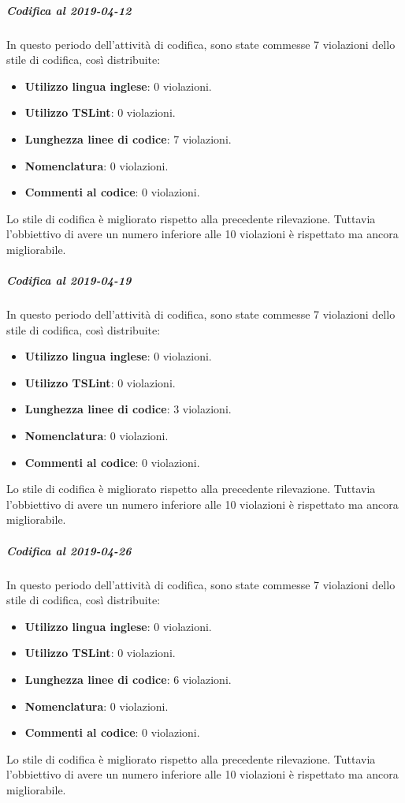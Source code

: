 \subparagraph{Codifica al 2019-04-12}
In questo periodo dell'attività di codifica, sono state commesse 7 violazioni dello stile di codifica, così distribuite:
 \begin{itemize}
 	\item \textbf{Utilizzo lingua inglese}: 0 violazioni.
 	\item \textbf{Utilizzo TSLint}: 0 violazioni.
 	\item \textbf{Lunghezza linee di codice}: 7 violazioni.
 	\item \textbf{Nomenclatura}: 0 violazioni.
 	\item \textbf{Commenti al codice}: 0 violazioni.
 \end{itemize}
Lo stile di codifica è migliorato rispetto alla precedente rilevazione. Tuttavia l'obbiettivo di avere un numero inferiore alle 10 violazioni è rispettato ma ancora migliorabile.

\subparagraph{Codifica al 2019-04-19}
In questo periodo dell'attività di codifica, sono state commesse 7 violazioni dello stile di codifica, così distribuite:
 \begin{itemize}
 	\item \textbf{Utilizzo lingua inglese}: 0 violazioni.
 	\item \textbf{Utilizzo TSLint}: 0 violazioni.
 	\item \textbf{Lunghezza linee di codice}: 3 violazioni.
 	\item \textbf{Nomenclatura}: 0 violazioni.
 	\item \textbf{Commenti al codice}: 0 violazioni.
 \end{itemize}
Lo stile di codifica è migliorato rispetto alla precedente rilevazione. Tuttavia l'obbiettivo di avere un numero inferiore alle 10 violazioni è rispettato ma ancora migliorabile.

\subparagraph{Codifica al 2019-04-26}
In questo periodo dell'attività di codifica, sono state commesse 7 violazioni dello stile di codifica, così distribuite:
 \begin{itemize}
 	\item \textbf{Utilizzo lingua inglese}: 0 violazioni.
 	\item \textbf{Utilizzo TSLint}: 0 violazioni.
 	\item \textbf{Lunghezza linee di codice}: 6 violazioni.
 	\item \textbf{Nomenclatura}: 0 violazioni.
 	\item \textbf{Commenti al codice}: 0 violazioni.
 \end{itemize}
Lo stile di codifica è migliorato rispetto alla precedente rilevazione. Tuttavia l'obbiettivo di avere un numero inferiore alle 10 violazioni è rispettato ma ancora migliorabile.

